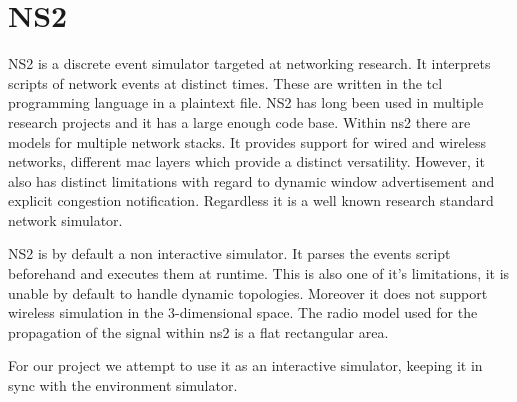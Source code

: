 \section{NS2}
NS2 is a discrete event simulator targeted at networking research. It interprets
scripts of network events at distinct times. These are written in the tcl
programming language in a plaintext file. NS2 has long been used in multiple
research projects and it has a large enough code base. Within ns2 there are
models for multiple network stacks. It provides support for wired and wireless
networks, different mac layers which provide a distinct versatility. However, it
also has distinct limitations with regard to dynamic window advertisement and
explicit congestion notification. Regardless it is a well known research
standard network simulator.

NS2 is by default a non interactive simulator. It parses the events script
beforehand and executes them at runtime. This is also one of it's limitations,
it is unable by default to handle dynamic topologies. Moreover it does not
support wireless simulation in the 3-dimensional space. The radio model used for
the propagation of the signal within ns2 is a flat rectangular area.

For our project we attempt to use it as an interactive simulator, keeping it in
sync with the environment simulator.

